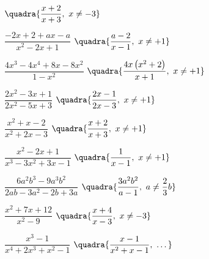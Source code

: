 \begin{esercizio}[\Ast]
\begin{multicols}{2}
\begin{enumeratea}
  \hfill {\footnotesize \(\quadra{\dfrac{x+2}{x+3},~ x \neq -3}\)}
 \item \(\dfrac{-2x+2+ax-a}{x^{2}-2x+1}\)
  \hfill {\footnotesize \(\quadra{\dfrac{a-2}{x-1},~ x \neq +1}\)}
 \item \(\dfrac{4x^{3}-4x^{4}+8x-8x^{2}}{1-x^{2}}\)
  \hfill {\footnotesize \(\quadra{\dfrac{4x\left(x^2+2\right)}{x+1},
                                 ~ x \neq +1}\)}
 \item \(\dfrac{2x^{2}-3x+1}{2x^{2}-5x+3}\)
  \hfill {\footnotesize \(\quadra{\dfrac{2x-1}{2x-3},~ x \neq +1}\)}
 \item \(\dfrac{x^{2}+x-2}{x^{2}+2x-3}\)
  \hfill {\footnotesize \(\quadra{\dfrac{x+2}{x+3},~ x \neq +1}\)}
 \item \(\dfrac{x^{2}-2x+1}{x^{3}-3x^{2}+3x-1}\)
  \hfill {\footnotesize \(\quadra{\dfrac{1}{x-1},~ x \neq +1}\)}
 \item \(\dfrac{6a^{2}b^{3}-9a^{3}b^{2}}{2ab-3a^{2}-2b+3a}\)
  \hfill {\footnotesize \(\quadra{\dfrac{3a^{2}b^{2}}{a-1},~ 
                                 a \neq \dfrac{2}{3}b}\)}
 \item \(\dfrac{x^{2}+7x+12}{x^{2}-9}\)
  \hfill {\footnotesize \(\quadra{\dfrac{x+4}{x-3},~ x \neq -3}\)}
 \item \(\dfrac{x^{3}-1}{x^{4}+2x^{3}+x^{2}-1}\)
  \hfill {\footnotesize \(\quadra{\dfrac{x-1}{x^2+x-1},~\dots}\)}
\end{enumeratea}
\end{multicols}
\end{esercizio}

